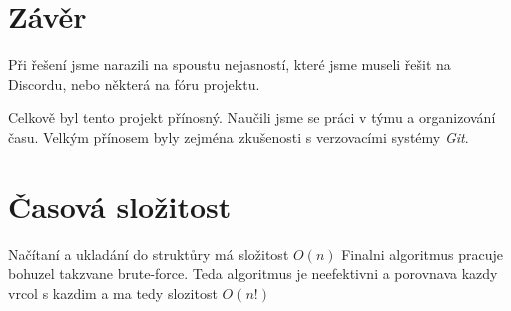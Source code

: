 
\section{Závěr}
Při řešení jsme narazili na spoustu nejasností, které jsme museli řešit na Discordu, nebo některá na fóru projektu.

Celkově byl tento projekt přínosný. Naučili jsme se práci v týmu a organizování času.
Velkým přínosem byly zejména zkušenosti s verzovacími systémy \textit{Git}.

\section{Časová složitost}
Načítaní a ukladání do struktůry má složitost $O(n)$
Finalni algoritmus pracuje bohuzel takzvane brute-force. Teda algoritmus je neefektivni a porovnava kazdy vrcol s kazdim
a ma tedy slozitost $O(n!)$
\newpage